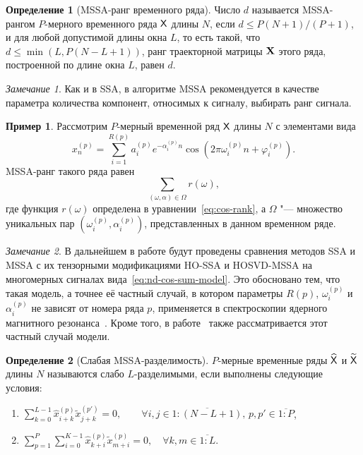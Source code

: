 \documentclass[specialist,
  substylefile=spbu.rtx,
subf,href,colorlinks=true, 12pt]{disser}
\theoremstyle{plain}
\theoremstyle{definition}
\newtheorem{definition}{Определение}[section]
\newtheorem{example}{Пример}[section]
\theoremstyle{remark}
\newtheorem*{remark}{Замечание}
\begin{document}
\begin{definition}[MSSA-ранг временного ряда]
  \label{def:mssa-rank}
  Число $d$ называется MSSA-рангом $P$-мерного временного ряда $\mathsf{X}$ длины $N$, если $d \leqslant P(N+1) / (P+1)$,
  и для любой допустимой
  длины окна $L$,
  то есть такой, что $d \leqslant \min(L, P(N- L + 1))$, ранг траекторной матрицы $\mathbf{X}$ этого ряда,
  построенной по длине окна $L$, равен $d$.
\end{definition}
\begin{remark}
  Как и в SSA, в алгоритме MSSA рекомендуется в качестве параметра количества компонент, относимых к сигналу,
  выбирать ранг сигнала.
\end{remark}
\begin{example}
  \label{ex:mssa-ranks}
  Рассмотрим $P$-мерный временной ряд $\mathsf{X}$ длины $N$ с элементами вида
  \begin{equation}
    \label{eq:nd-cos-sum-model}
    x_n^{(p)} = \sum_{i=1}^{R(p)} a_i^{(p)} e^{-\alpha_i^{(p)} n}
    \cos\left(2 \pi \omega_i^{(p)} n + \varphi_i^{(p)}\right).
  \end{equation}
  MSSA-ранг такого ряда равен
  \begin{equation}
    \sum_{(\omega, \alpha)\in \Omega} r(\omega),
  \end{equation}
  где функция $r(\omega)$ определена в уравнении~\eqref{eq:cos-rank}, а $\Omega$ "--- множество уникальных пар
  \linebreak $\left(\omega_i^{(p)}, \alpha_i^{(p)}\right)$, представленных в данном временном ряде.
\end{example}

\begin{remark}
  В дальнейшем в работе будут проведены сравнения методов SSA и MSSA с их тензорными модификациями
  HO-SSA и HOSVD-MSSA на многомерных сигналах вида~\eqref{eq:nd-cos-sum-model}.
  Это обосновано тем, что такая модель, а точнее её частный случай, в котором параметры $R(p)$, $\omega_i^{(p)}$
  и $\alpha_i^{(p)}$ не зависят от номера ряда $p$, применяется в спектроскопии ядерного магнитного
  резонанса~\cite{NMR}.
  Кроме того, в работе~\cite{hosvd-hooi-separation} также рассматривается этот частный случай модели.
\end{remark}

\begin{definition}[Слабая MSSA-разделимость]
  \label{def:mssa-separability}
  $P$-мерные временные ряды $\widehat{\mathsf{X}}$ и $\widetilde{\mathsf{X}}$ длины $N$ называются слабо $L$-разделимыми, если
  выполнены следующие условия:
  \begin{enumerate}
    \item $\displaystyle \sum_{k=0}^{L-1} \hat{x}_{i+k}^{(p)}\tilde{x}_{j+k}^{(p')} = 0,
      \qquad \forall i, j \in \overline{1:(N-L+1)},\, p, p' \in \overline{1:P}$,
    \item $\displaystyle \sum_{p=1}^{P} \sum_{i=0}^{K-1} \hat{x}_{k+i}^{(p)} \tilde{x}_{m+i}^{(p)} = 0, \quad
      \forall k, m \in \overline{1:L}$.
  \end{enumerate}
\end{definition}
\end{document}
